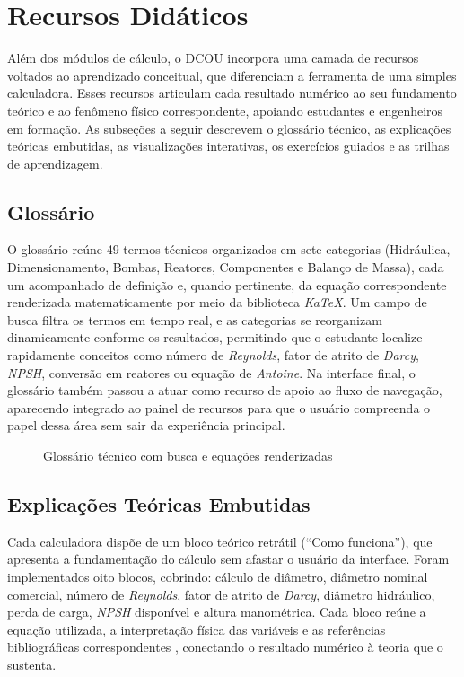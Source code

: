 \section{Recursos Didáticos}

Além dos módulos de cálculo, o DCOU incorpora uma camada de recursos voltados ao aprendizado conceitual, que diferenciam a ferramenta de uma simples calculadora. Esses recursos articulam cada resultado numérico ao seu fundamento teórico e ao fenômeno físico correspondente, apoiando estudantes e engenheiros em formação. As subseções a seguir descrevem o glossário técnico, as explicações teóricas embutidas, as visualizações interativas, os exercícios guiados e as trilhas de aprendizagem.

\subsection{Glossário}

O glossário reúne 49 termos técnicos organizados em sete categorias (Hidráulica, Dimensionamento, Bombas, Reatores, Componentes e Balanço de Massa), cada um acompanhado de definição e, quando pertinente, da equação correspondente renderizada matematicamente por meio da biblioteca \textit{KaTeX}. Um campo de busca filtra os termos em tempo real, e as categorias se reorganizam dinamicamente conforme os resultados, permitindo que o estudante localize rapidamente conceitos como número de \textit{Reynolds}, fator de atrito de \textit{Darcy}, \textit{NPSH}, conversão em reatores ou equação de \textit{Antoine}. Na interface final, o glossário também passou a atuar como recurso de apoio ao fluxo de navegação, aparecendo integrado ao painel de recursos para que o usuário compreenda o papel dessa área sem sair da experiência principal.

\begin{figure}[H]
    \centering
    \caption{Glossário técnico com busca e equações renderizadas}
    \label{fig:glossario}
\end{figure}

\subsection{Explicações Teóricas Embutidas}

Cada calculadora dispõe de um bloco teórico retrátil (``Como funciona''), que apresenta a fundamentação do cálculo sem afastar o usuário da interface. Foram implementados oito blocos, cobrindo: cálculo de diâmetro, diâmetro nominal comercial, número de \textit{Reynolds}, fator de atrito de \textit{Darcy}, diâmetro hidráulico, perda de carga, \textit{NPSH} disponível e altura manométrica. Cada bloco reúne a equação utilizada, a interpretação física das variáveis e as referências bibliográficas correspondentes \cite{white2018, perry2007}, conectando o resultado numérico à teoria que o sustenta.

